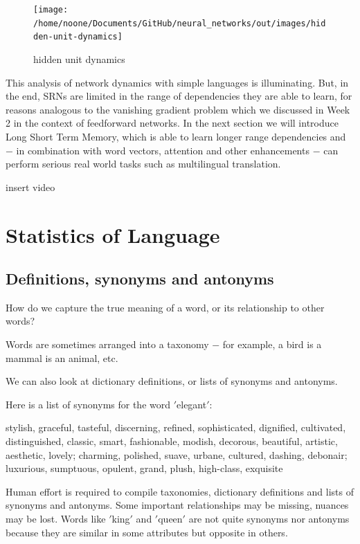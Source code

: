 \documentclass[11pt]{article}
\begin{document}
\begin{figure}[h]
    \centering
    \texttt{[image: /home/noone/Documents/GitHub/neural\_networks/out/images/hidden-unit-dynamics]}
    \caption[hidden unit dynamics]{hidden unit dynamics}
    \label{fig: hidden unit dynamics}
\end{figure}

This analysis of network dynamics with simple languages is illuminating.
But, in the end, SRNs are limited in the range of dependencies they are able to learn, for reasons analogous to the vanishing gradient problem which we discussed in Week 2 in the context of feedforward networks.
In the next section we will introduce Long Short Term Memory, which is able to learn longer range dependencies and $-$ in combination with word vectors, attention and other enhancements $-$ can perform serious real world tasks such as multilingual translation.

insert video

\section{Statistics of Language}\label{sec:statistics-of-language}
\subsection{Definitions, synonyms and antonyms}\label{subsec:definitions-synonyms-and-antonyms}

How do we capture the true meaning of a word, or its relationship to other words?

Words are sometimes arranged into a taxonomy $-$ for example, a bird is a mammal is an animal, etc.

We can also look at dictionary definitions, or lists of synonyms and antonyms.

Here is a list of synonyms for the word \('\)elegant\('\):

    stylish, graceful, tasteful, discerning, refined, sophisticated, dignified, cultivated, distinguished, classic, smart, fashionable, modish, decorous, beautiful, artistic, aesthetic, lovely; charming, polished, suave, urbane, cultured, dashing, debonair; luxurious, sumptuous, opulent, grand, plush, high-class, exquisite

Human effort is required to compile taxonomies, dictionary definitions and lists of synonyms and antonyms.
Some important relationships may be missing, nuances may be lost.
Words like \('\)king\('\) and \('\)queen\('\) are not quite synonyms nor antonyms because they are similar in some attributes but opposite in others.
\end{document}
